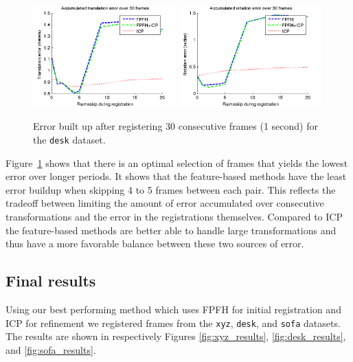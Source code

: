 \documentclass[a4paper]{article}
\begin{document}
\begin{figure}[htbp]
    \centering
        \includegraphics[width=0.49\textwidth]{ims/deskAccumulatedtranslationerrorover30frames.png}
        \includegraphics[width=0.49\textwidth]{ims/deskAccumulatedrotationerrorover30frames.png}
    \caption{Error built up after registering 30 consecutive frames (1 second) for the \texttt{desk} dataset.}
    \label{fig:accumulated_error}
\end{figure}

Figure~\ref{fig:accumulated_error} shows that there is an optimal selection of frames that yields the lowest error over longer periods. It shows that the feature-based methods have the least error buildup when skipping 4 to 5 frames between each pair. This reflects the tradeoff between limiting the amount of error accumulated over consecutive transformations and the error in the registrations themselves. Compared to \ac{ICP} the feature-based methods are better able to handle large transformations and thus have a more favorable balance between these two sources of error.

\subsection{Final results}

Using our best performing method which uses \ac{FPFH} for initial registration and \ac{ICP} for refinement we registered frames from the \texttt{xyz}, \texttt{desk}, and \texttt{sofa} datasets. The results are shown in respectively Figures \ref{fig:xyz_results}, \ref{fig:desk_results}, and \ref{fig:sofa_results}.
\end{document}
